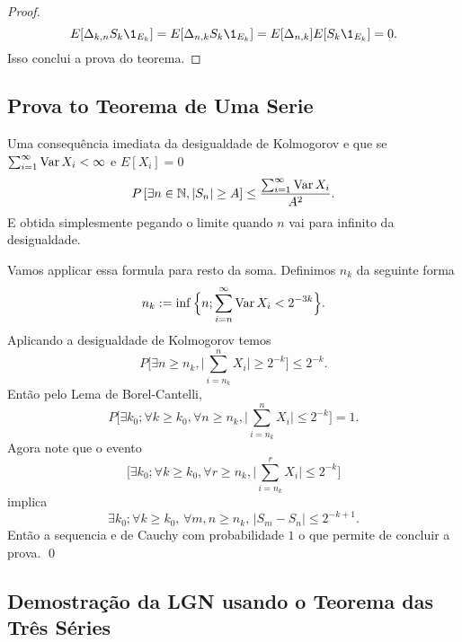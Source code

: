 \begin{topics}
\begin{proof}
 \begin{equation}
   E[ \Delta_{k,n} S_k \1_{E_k}]=E[\Delta_{n,k}S_k \1_{E_k}]=E[\Delta_{n,k}]E[S_k \1_{E_k}]=0.
 \end{equation}
 Isso conclui a prova do teorema.
\end{proof}

\subsection{Prova to Teorema de Uma Serie}

Uma consequência imediata da desigualdade de Kolmogorov e que se \\ $\sum_{i=1}^{\infty} \operatorname{Var} X_i<\infty$ e $E[X_i]=0$
$$P\left[ \exists n\in {\ensuremath{\mathbb N}},  |S_n| \ge A \right] \le \frac{\sum_{i=1}^{\infty} \operatorname{Var} X_i}{A^2}.$$
E obtida simplesmente pegando o limite quando $n$ vai para infinito da desigualdade.

\medskip

Vamos applicar essa formula para resto da soma.
Definimos $n_k$ da seguinte forma
\begin{equation}
  n_k:= \inf \Big\{ n; \sum_{i=n}^{\infty} \operatorname{Var} X_i < 2^{-3k} \Big\}.
\end{equation}
Aplicando a desigualdade de Kolmogorov temos
\begin{equation}
  P \Big[ \exists n \ge n_k,  \Big| \sum_{i=n_k}^n X_i \Big| \ge 2^{-k} \Big] \le 2^{-k}.
\end{equation}
Então pelo Lema de Borel-Cantelli,
\begin{equation}
  P \Big[
  \exists k_0; \forall k\ge k_0, \forall n \ge n_k, \Big| \sum_{i = n_k}^n X_i \Big| \le 2^{-k}
  \Big]=1.
\end{equation}
Agora note que o evento
\begin{equation}
  \Big[ \exists k_0; \forall k\ge k_0, \forall r\ge n_k,
  \Big| \sum_{i=n_k}^r X_i \Big|
  \le 2^{-k} \Big]
\end{equation}
implica
\begin{equation}
  \exists k_0; \forall k \ge k_0,\, \forall m, n \ge n_k, \, |S_m - S_n| \le 2^{-k+1}.
\end{equation}
Então a sequencia e de Cauchy com probabilidade $1$ o que permite de concluir a prova. \qed




\subsection{Demostração da LGN usando o Teorema das Três Séries}


\end{topics}
